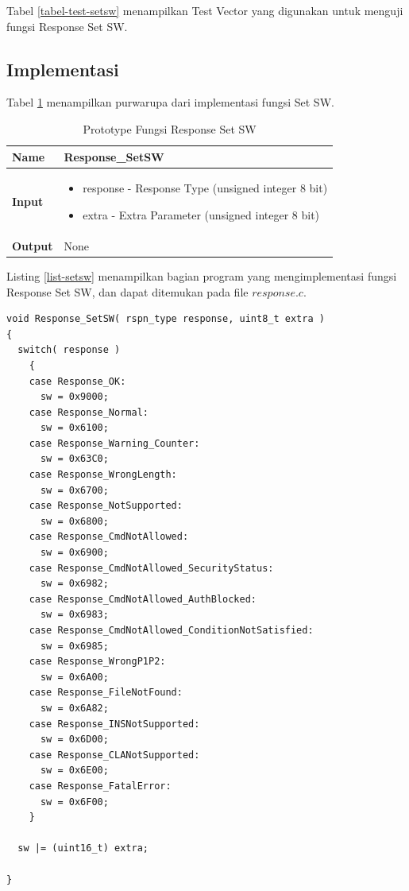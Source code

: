 Tabel \ref{tabel-test-setsw} menampilkan Test Vector yang digunakan untuk menguji fungsi Response Set SW.


\subsection {Implementasi}

Tabel \ref{tabel-setsw} menampilkan purwarupa dari implementasi fungsi Set SW. 

\begin{table}[h]
  \centering
  \begin{tabular}{m{2cm} p{8cm}}
    \hline
    {\bf Name} & Response\_SetSW\\
    \hline
    {\bf Input} & 
    \begin{itemize}[noitemsep,topsep=0pt,parsep=0pt,partopsep=0pt]
    \item response - Response Type (unsigned integer 8 bit)
    \item extra - Extra Parameter (unsigned integer 8 bit)
    \end{itemize}
    \\
    \hline
    {\bf Output} & None
    \\
    \hline
  \end{tabular}
  \caption{Prototype Fungsi Response Set SW}
  \label{tabel-setsw}
\end{table}

Listing \ref{list-setsw} menampilkan bagian program yang mengimplementasi fungsi Response Set SW, dan dapat ditemukan pada file $response.c$.

\begin{lstlisting}[caption={Implementasi Fungsi Response Set SW}, label={list-setsw}]
void Response_SetSW( rspn_type response, uint8_t extra )
{
  switch( response ) 
    {
    case Response_OK:
      sw = 0x9000;
    case Response_Normal:
      sw = 0x6100;
    case Response_Warning_Counter:
      sw = 0x63C0;
    case Response_WrongLength:
      sw = 0x6700;
    case Response_NotSupported:
      sw = 0x6800;
    case Response_CmdNotAllowed:
      sw = 0x6900;
    case Response_CmdNotAllowed_SecurityStatus:
      sw = 0x6982;
    case Response_CmdNotAllowed_AuthBlocked:
      sw = 0x6983;
    case Response_CmdNotAllowed_ConditionNotSatisfied:
      sw = 0x6985;
    case Response_WrongP1P2:
      sw = 0x6A00;
    case Response_FileNotFound:
      sw = 0x6A82;
    case Response_INSNotSupported:
      sw = 0x6D00;
    case Response_CLANotSupported:
      sw = 0x6E00;
    case Response_FatalError:
      sw = 0x6F00;
    }

  sw |= (uint16_t) extra;

}
\end{lstlisting}

